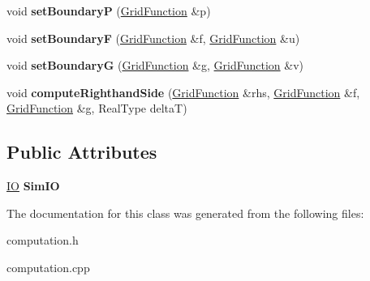 \begin{DoxyCompactItemize}
\item 
\hypertarget{classComputation_a43d0b65ed6493243d7a7eb6a47f0d93c}{void {\bfseries set\-Boundary\-P} (\hyperlink{classGridFunction}{Grid\-Function} \&p)}\label{classComputation_a43d0b65ed6493243d7a7eb6a47f0d93c}

\item 
\hypertarget{classComputation_a9a5f1ebff2fb7f3fc4690c26b34ad2a8}{void {\bfseries set\-Boundary\-F} (\hyperlink{classGridFunction}{Grid\-Function} \&f, \hyperlink{classGridFunction}{Grid\-Function} \&u)}\label{classComputation_a9a5f1ebff2fb7f3fc4690c26b34ad2a8}

\item 
\hypertarget{classComputation_ae4105e9c89e6a8d28f79f13dcea1df26}{void {\bfseries set\-Boundary\-G} (\hyperlink{classGridFunction}{Grid\-Function} \&g, \hyperlink{classGridFunction}{Grid\-Function} \&v)}\label{classComputation_ae4105e9c89e6a8d28f79f13dcea1df26}

\item 
\hypertarget{classComputation_a6596833e2001d82c870fd09fa4d6d566}{void {\bfseries compute\-Righthand\-Side} (\hyperlink{classGridFunction}{Grid\-Function} \&rhs, \hyperlink{classGridFunction}{Grid\-Function} \&f, \hyperlink{classGridFunction}{Grid\-Function} \&g, Real\-Type delta\-T)}\label{classComputation_a6596833e2001d82c870fd09fa4d6d566}

\end{DoxyCompactItemize}
\subsection*{Public Attributes}
\begin{DoxyCompactItemize}
\item 
\hypertarget{classComputation_a185aaf3c9010df79df3e893ebfd0e80b}{\hyperlink{classIO}{I\-O} {\bfseries Sim\-I\-O}}\label{classComputation_a185aaf3c9010df79df3e893ebfd0e80b}

\end{DoxyCompactItemize}


The documentation for this class was generated from the following files\-:\begin{DoxyCompactItemize}
\item 
computation.\-h\item 
computation.\-cpp\end{DoxyCompactItemize}
